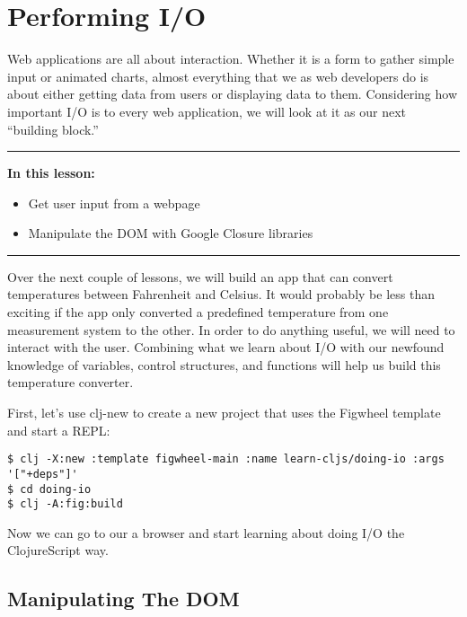 \documentclass[10pt,twoside,openright]{memoir}
\begin{document}
\chapter{Performing I/O}

Web applications are all about interaction. Whether it is a form to
gather simple input or animated charts, almost everything that we as web
developers do is about either getting data from users or displaying data
to them. Considering how important I/O is to every web application, we
will look at it as our next ``building block.''

\begin{center}\rule{0.5\linewidth}{0.5pt}\end{center}

\textbf{In this lesson:}

\begin{itemize}
\tightlist
\item
  Get user input from a webpage
\item
  Manipulate the DOM with Google Closure libraries
\end{itemize}

\begin{center}\rule{0.5\linewidth}{0.5pt}\end{center}

Over the next couple of lessons, we will build an app that can convert
temperatures between Fahrenheit and Celsius. It would probably be less
than exciting if the app only converted a predefined temperature from
one measurement system to the other. In order to do anything useful, we
will need to interact with the user. Combining what we learn about I/O
with our newfound knowledge of variables, control structures, and
functions will help us build this temperature converter.

First, let's use clj-new to create a new project that uses the Figwheel
template and start a REPL:

\begin{verbatim}
$ clj -X:new :template figwheel-main :name learn-cljs/doing-io :args '["+deps"]'
$ cd doing-io
$ clj -A:fig:build
\end{verbatim}

Now we can go to our a browser and start learning about doing I/O the
ClojureScript way.

\section{Manipulating The DOM}
\end{document}
